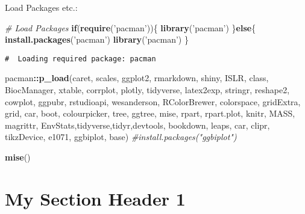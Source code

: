 \documentclass[11pt,english,a4paper,oneside]{article}
\newenvironment{Shaded}{\begin{snugshade}}{\end{snugshade}}
\newcommand{\CommentTok}[1]{\textcolor[rgb]{0.56,0.35,0.01}{\textit{#1}}}
\newcommand{\ControlFlowTok}[1]{\textcolor[rgb]{0.13,0.29,0.53}{\textbf{#1}}}
\newcommand{\DecValTok}[1]{\textcolor[rgb]{0.00,0.00,0.81}{#1}}
\newcommand{\KeywordTok}[1]{\textcolor[rgb]{0.13,0.29,0.53}{\textbf{#1}}}
\newcommand{\NormalTok}[1]{#1}
\newcommand{\OperatorTok}[1]{\textcolor[rgb]{0.81,0.36,0.00}{\textbf{#1}}}
\newcommand{\StringTok}[1]{\textcolor[rgb]{0.31,0.60,0.02}{#1}}
\begin{document}
Load Packages etc.:

\begin{Shaded}
\begin{Highlighting}[]
\CommentTok{# Load Packages}
\ControlFlowTok{if}\NormalTok{(}\KeywordTok{require}\NormalTok{(}\StringTok{'pacman'}\NormalTok{))\{}
  \KeywordTok{library}\NormalTok{(}\StringTok{'pacman'}\NormalTok{)}
\NormalTok{\}}\ControlFlowTok{else}\NormalTok{\{}
  \KeywordTok{install.packages}\NormalTok{(}\StringTok{'pacman'}\NormalTok{)}
  \KeywordTok{library}\NormalTok{(}\StringTok{'pacman'}\NormalTok{)}
\NormalTok{\}}
\end{Highlighting}
\end{Shaded}

\begin{verbatim}
#  Loading required package: pacman
\end{verbatim}

\begin{Shaded}
\begin{Highlighting}[]
\NormalTok{pacman}\OperatorTok{::}\KeywordTok{p_load}\NormalTok{(caret, scales, ggplot2, rmarkdown, shiny, ISLR, class, BiocManager, xtable,}
\NormalTok{               corrplot, plotly, tidyverse, latex2exp, stringr, reshape2, cowplot, ggpubr,}
\NormalTok{               rstudioapi, wesanderson, RColorBrewer, colorspace, gridExtra, grid, car,}
\NormalTok{               boot, colourpicker, tree, ggtree, mise, rpart, rpart.plot, knitr, MASS,}
\NormalTok{               magrittr, EnvStats,tidyverse,tidyr,devtools, bookdown, leaps, car, clipr,}
\NormalTok{               tikzDevice, e1071, ggbiplot, base)}
\CommentTok{#install.packages("ggbiplot")}

\KeywordTok{mise}\NormalTok{()}
\end{Highlighting}
\end{Shaded}



\begin{Shaded}
\end{Shaded}

\hypertarget{my-section-header-1}{%
\section{My Section Header 1}\label{my-section-header-1}}
\end{document}
